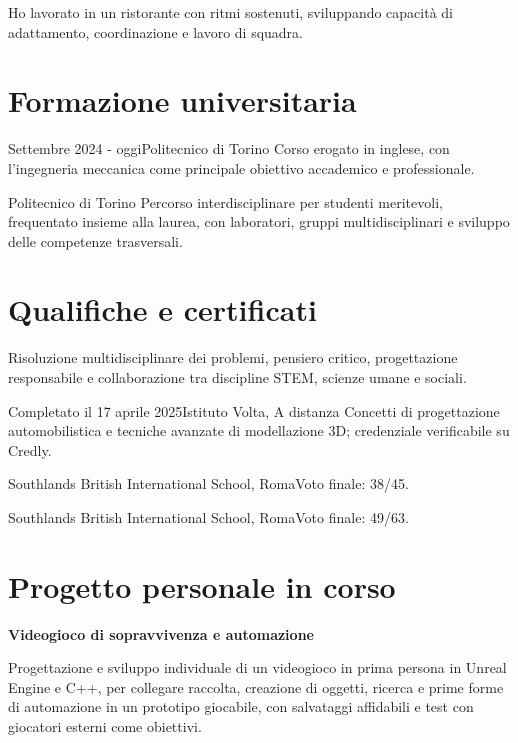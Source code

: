 \documentclass[a4paper,10pt]{article}
\begin{document}
  {Ho lavorato in un ristorante con ritmi sostenuti, sviluppando capacità di
  adattamento, coordinazione e lavoro di squadra.}

\section*{Formazione universitaria}
  {Settembre 2024 - oggi}{Politecnico di Torino}
  {Corso erogato in inglese, con l'ingegneria meccanica come principale
  obiettivo accademico e professionale.}

  {Politecnico di Torino}
  {Percorso interdisciplinare per studenti meritevoli, frequentato insieme
  alla laurea, con laboratori, gruppi multidisciplinari e sviluppo delle
  competenze trasversali.}

\newpage

\section*{Qualifiche e certificati}
  {Risoluzione multidisciplinare dei problemi, pensiero critico,
  progettazione responsabile e collaborazione tra discipline STEM,
  scienze umane e sociali.}

  {Completato il 17 aprile 2025}{Istituto Volta, A distanza}
  {Concetti di progettazione automobilistica e tecniche avanzate di
  modellazione 3D; credenziale verificabile su Credly.}

  {Southlands British International School, Roma}{Voto finale: 38/45.}

  {Southlands British International School, Roma}{Voto finale: 49/63.}

\section*{Progetto personale in corso}
\textbf{Videogioco di sopravvivenza e automazione}\par
Progettazione e sviluppo individuale di un videogioco in prima persona in
Unreal Engine e C++, per collegare raccolta, creazione di oggetti, ricerca e
prime forme di automazione in un prototipo giocabile, con salvataggi affidabili
e test con giocatori esterni come obiettivi.
\end{document}
